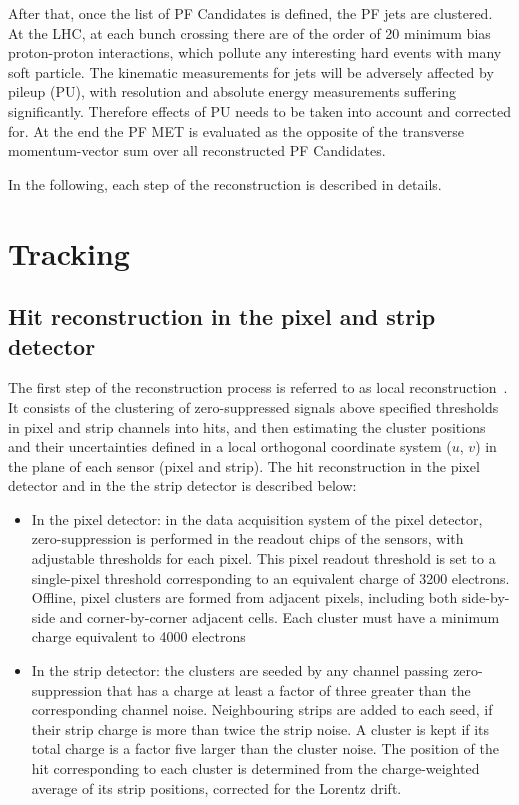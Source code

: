 After that, once the list of PF Candidates is defined, the PF jets are clustered. At the LHC,  at each bunch crossing there are of the order of 20 minimum bias proton-proton interactions, which pollute any interesting hard events with many soft particle. The kinematic measurements for jets will be adversely affected by pileup (PU), with resolution and absolute energy measurements
suffering significantly. Therefore effects of PU needs to be taken into account and corrected for. At the end the PF MET is evaluated as the opposite of the transverse momentum-vector sum over all reconstructed PF Candidates.

In the following, each step of the reconstruction is described in details. 

\section{Tracking}
\subsection*{Hit reconstruction in the pixel and strip detector}
The first step of the reconstruction process is referred to as local reconstruction~\cite{Chatrchyan:2014fea}.  It consists of the clustering of zero-suppressed
signals above specified thresholds in pixel and strip channels into hits,  and then estimating the cluster positions and their uncertainties defined in a local
orthogonal  coordinate  system ($u$, $v$) in  the  plane  of  each  sensor (pixel and strip). 
The  hit reconstruction in the pixel detector and in the the strip detector is described below:
\begin{itemize} 
\item In the pixel detector: in the data acquisition system of the pixel detector, zero-suppression is performed in the
readout chips of the sensors, with adjustable thresholds for each pixel.  This pixel readout threshold 
is set to a single-pixel threshold corresponding to an equivalent charge of 3200
electrons.  Offline, pixel clusters are formed from adjacent pixels, including both side-by-side
and corner-by-corner adjacent cells.  Each cluster must have a minimum charge equivalent to
4000 electrons
\item In the strip detector:  the clusters are seeded by any channel passing zero-suppression that has a charge at least a
factor of three greater than the corresponding channel noise. Neighbouring strips are added
to each seed, if their strip charge is more than twice the strip noise. 
A cluster is kept if its total charge is a factor five larger than the cluster noise.
The position of the hit corresponding to each cluster is determined from the charge-weighted
average of its strip positions, corrected for the  Lorentz drift.
\end{itemize}

